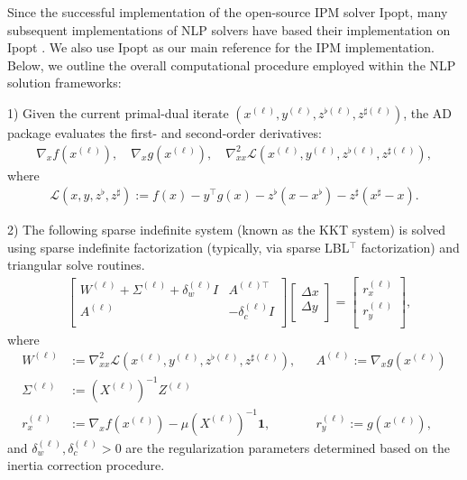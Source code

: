 Since the successful implementation of the open-source IPM solver
Ipopt, many subsequent implementations of NLP solvers
\cite{chiang2014structured,rodriguez2023scalable,shin2021graph} have
based their implementation on Ipopt
\cite{wachter2006implementation}. We also use Ipopt as our main
reference for the IPM implementation. Below, we outline the overall
computational procedure employed within the NLP solution frameworks:

1) Given the current primal-dual iterate $(x^{(\ell)},y^{(\ell)},
z^{\flat(\ell)},z^{\sharp(\ell)})$, the AD package evaluates the first-
and second-order derivatives:
\begin{align*}
  \nabla_x f(x^{(\ell)}),\quad
  \nabla_x g(x^{(\ell)}),\quad
  \nabla^2_{xx} \mathcal{L}(x^{(\ell)},y^{(\ell)},z^{\flat(\ell)},z^{\sharp(\ell)}),
\end{align*}
where
\begin{align*}
  \mathcal{L}(x,y,z^{\flat},z^{\sharp}):=f(x) - y^\top
  g(x) - z^\flat (x-x^\flat) - z^\sharp (x^\sharp-x).
\end{align*}

2) The following sparse indefinite system (known as the KKT system) is
solved using sparse indefinite factorization (typically, via sparse
LBL$^\top$ factorization) and triangular solve routines.
\begin{align}\label{eqn:kkt-indefinite}
  &\begin{bmatrix}
    W^{(\ell)}  + \Sigma^{(\ell)} + \delta^{(\ell)}_w I& A^{(\ell)\top}\\
    A^{(\ell)} & -\delta_c^{(\ell)} I\\
  \end{bmatrix}
  \begin{bmatrix}
    \Delta x\\
    \Delta y\\
  \end{bmatrix}=
  \begin{bmatrix}
    r_x^{(\ell)}\\
    r_y^{(\ell)}\\
  \end{bmatrix},
\end{align}
where
\begin{align*}
  W^{(\ell)}
  &:=\nabla^{2}_{xx}\mathcal{L}(x^{(\ell)},y^{(\ell)},z^{\flat(\ell)},z^{\sharp(\ell)}),
  &&A^{(\ell)}:= \nabla_xg(x^{(\ell)})\\
  \Sigma^{(\ell)}&:= (X^{(\ell)})^{-1}Z^{(\ell)}\\
  r_x^{(\ell)}
  &:=\nabla_x f(x^{(\ell)}) - \mu (X^{(\ell)})^{-1} \boldsymbol{1},
  &&r_y^{(\ell)}:=g(x^{(\ell)}),
\end{align*}
and $\delta^{(\ell)}_w, \delta^{(\ell)}_c>0$ are the regularization parameters
determined based on the inertia correction procedure.

